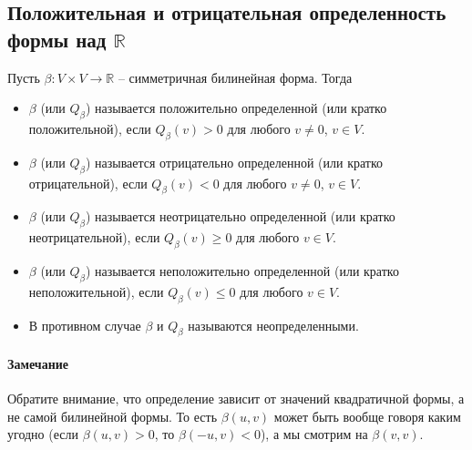 \subsection{Положительная и отрицательная определенность формы над $\mathbb R$}

\begin{definition}
Пусть $\beta\colon V\times V\to \mathbb R$ -- симметричная билинейная форма.
Тогда
\begin{itemize}
\item $\beta$ (или $Q_\beta$) называется положительно определенной (или кратко положительной), если $Q_\beta(v) > 0$ для любого $v\neq 0$, $v\in V$.

\item $\beta$ (или $Q_\beta$) называется отрицательно определенной (или кратко отрицательной), если $Q_\beta(v) < 0$ для любого $v\neq 0$, $v\in V$.

\item $\beta$ (или $Q_\beta$) называется неотрицательно определенной (или кратко неотрицательной), если $Q_\beta(v) \geqslant 0$ для любого $v\in V$.

\item $\beta$ (или $Q_\beta$) называется неположительно определенной (или кратко неположительной), если $Q_\beta(v) \leqslant 0$ для любого $v\in V$.

\item В противном случае $\beta$ и $Q_\beta$ называются неопределенными.
\end{itemize}
\end{definition}

\paragraph{Замечание}

Обратите внимание, что определение зависит от значений квадратичной формы, а не самой билинейной формы.
То есть $\beta(u,v)$ может быть вообще говоря каким угодно (если $\beta(u, v) >0$, то $\beta(-u, v)< 0$), а мы смотрим на $\beta(v, v)$.

